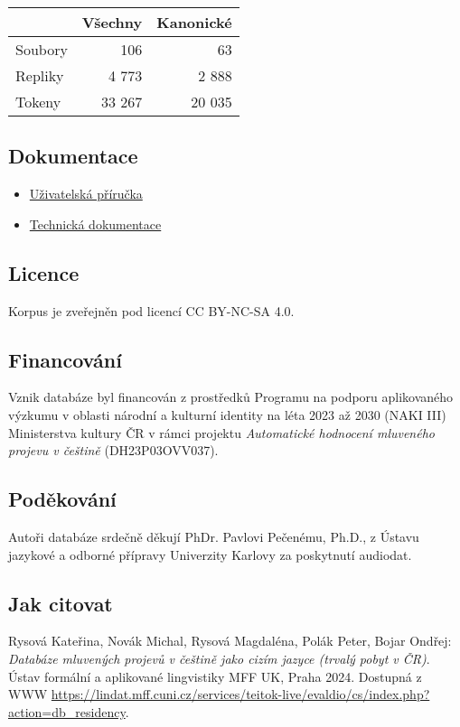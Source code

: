 \documentclass[
]{article}
\providecommand{\tightlist}{%
  \setlength{\itemsep}{0pt}\setlength{\parskip}{0pt}}
\begin{document}
\begin{longtable}[]{@{}lrr@{}}
\toprule
& Všechny & Kanonické\tabularnewline
\midrule
\endhead
Soubory & 106 & 63\tabularnewline
Repliky & 4 773 & 2 888\tabularnewline
Tokeny & 33 267 & 20 035\tabularnewline
\bottomrule
\end{longtable}

\hypertarget{dokumentace}{%
\subsection{Dokumentace}\label{dokumentace}}

\begin{itemize}
\tightlist
\item
  \href{USER_MANUAL-cs.md}{Uživatelská příručka}
\item
  \href{TECH_DOC-cs.md}{Technická dokumentace}
\end{itemize}

\hypertarget{licence}{%
\subsection{Licence}\label{licence}}

Korpus je zveřejněn pod licencí CC BY-NC-SA 4.0.

\hypertarget{financovuxe1nuxed}{%
\subsection{Financování}\label{financovuxe1nuxed}}

Vznik databáze byl financován z prostředků Programu na podporu
aplikovaného výzkumu v oblasti národní a kulturní identity na léta 2023
až 2030 (NAKI III) Ministerstva kultury ČR v rámci projektu
\emph{Automatické hodnocení mluveného projevu v češtině}
(DH23P03OVV037).

\hypertarget{podux11bkovuxe1nuxed}{%
\subsection{Poděkování}\label{podux11bkovuxe1nuxed}}

Autoři databáze srdečně děkují PhDr. Pavlovi Pečenému, Ph.D., z Ústavu
jazykové a odborné přípravy Univerzity Karlovy za poskytnutí audiodat.

\hypertarget{jak-citovat}{%
\subsection{Jak citovat}\label{jak-citovat}}

Rysová Kateřina, Novák Michal, Rysová Magdaléna, Polák Peter, Bojar
Ondřej: \emph{Databáze mluvených projevů v češtině jako cizím jazyce
(trvalý pobyt v ČR)}. Ústav formální a aplikované lingvistiky MFF UK,
Praha 2024. Dostupná z WWW
\url{https://lindat.mff.cuni.cz/services/teitok-live/evaldio/cs/index.php?action=db_residency}.
\end{document}
